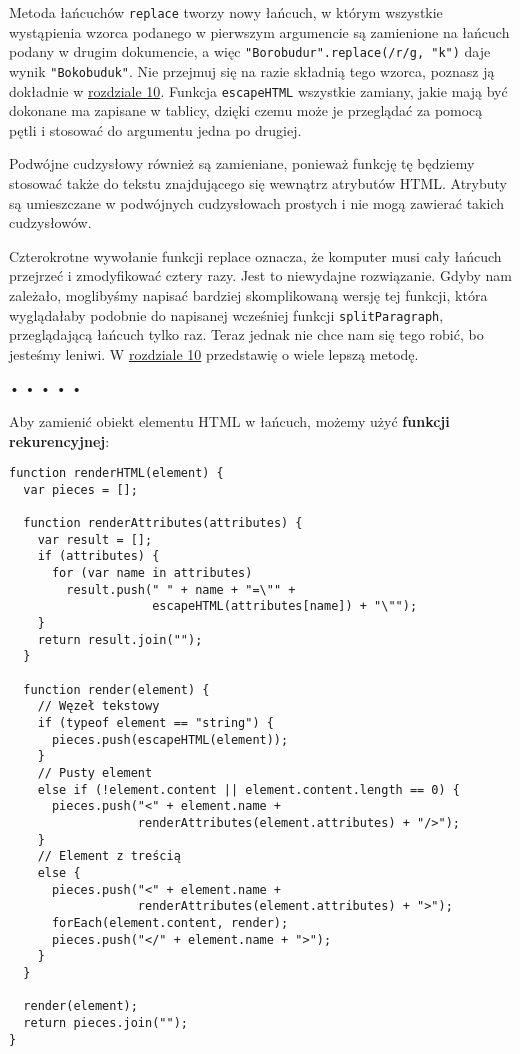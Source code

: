 Metoda łańcuchów \texttt{replace} tworzy nowy łańcuch, w którym wszystkie wystąpienia wzorca podanego w pierwszym argumencie są zamienione na łańcuch podany w drugim dokumencie, a więc \texttt{"Borobudur".replace(/r/g, "k")} daje wynik \texttt{"Bokobuduk"}. Nie przejmuj się na razie składnią tego wzorca, poznasz ją dokładnie w \hyperref[chap:10]{rozdziale 10}. Funkcja \texttt{escapeHTML} wszystkie zamiany, jakie mają być dokonane ma zapisane w tablicy, dzięki czemu może je przeglądać za pomocą pętli i stosować do argumentu jedna po drugiej.

  
Podwójne cudzysłowy również są zamieniane, ponieważ funkcję tę będziemy stosować także do tekstu znajdującego się wewnątrz atrybutów HTML. Atrybuty są umieszczane w podwójnych cudzysłowach prostych i nie mogą zawierać takich cudzysłowów.

  
Czterokrotne wywołanie funkcji replace oznacza, że komputer musi cały łańcuch przejrzeć i zmodyfikować cztery razy. Jest to niewydajne rozwiązanie. Gdyby nam zależało, moglibyśmy napisać bardziej skomplikowaną wersję tej funkcji, która wyglądałaby podobnie do napisanej wcześniej funkcji \texttt{splitParagraph}, przeglądającą łańcuch tylko raz. Teraz jednak nie chce nam się tego robić, bo jesteśmy leniwi. W \hyperref[chap:10]{rozdziale 10} przedstawię o wiele lepszą metodę.



\begin{center}
• • • • •
\end{center}

  
Aby zamienić obiekt elementu HTML w łańcuch, możemy użyć \textbf{funkcji rekurencyjnej}:

  
\begin{verbatim} 
function renderHTML(element) {
  var pieces = [];

  function renderAttributes(attributes) {
    var result = [];
    if (attributes) {
      for (var name in attributes) 
        result.push(" " + name + "=\"" +
                    escapeHTML(attributes[name]) + "\"");
    }
    return result.join("");
  }

  function render(element) {
    // Węzeł tekstowy
    if (typeof element == "string") {
      pieces.push(escapeHTML(element));
    }
    // Pusty element
    else if (!element.content || element.content.length == 0) {
      pieces.push("<" + element.name +
                  renderAttributes(element.attributes) + "/>");
    }
    // Element z treścią
    else {
      pieces.push("<" + element.name +
                  renderAttributes(element.attributes) + ">");
      forEach(element.content, render);
      pieces.push("</" + element.name + ">");
    }
  }

  render(element);
  return pieces.join("");
}
 \end{verbatim}
  
